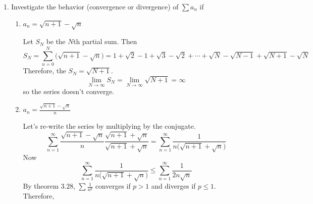 \begin{enumerate}
  Let \(\epsilon > 0\) be given.
  Then there exist \(N_1,N_2\in\mathbb{Z}^+\) such that for \(n\geq N_1\) and
  \(n\geq N_2\)
  \begin{align*}
    \lvert a_n - a\rvert & < \frac{\epsilon}{2}\\
    \lvert b_n - b\rvert & < \frac{\epsilon}{2}
  \end{align*}
  Let \(N = \max\{N_1,N_2\}\).
  Then when \(n\geq N\),
  \begin{align*}
    \lvert c_n - c\rvert & = \lvert a_n + b_n - (a + b)\rvert
                           \eqnumtag\label{3.5.a}\\
                         & \leq \lvert a_n - a\rvert + \lvert b_n - b\rvert
                           \eqnumtag\label{3.5.b}\\
                         & < \frac{\epsilon}{2} + \frac{\epsilon}{2}\\
                         & = \epsilon
  \end{align*}
  From \cref{3.5.a,3.5.b}, we have that
  \[
  \lim\sup c_n\leq\lim\sup a_n + \lim\sup b_n,
  \]
  and since \(c_n = a_n + b_n\), the identity follows.
\item
  Investigate the behavior (convergence or divergence) of \(\sum a_n\) if
  \begin{enumerate}[label = (\alph*)]
  \item
    \(a_n = \sqrt{n + 1} - \sqrt{n}\)
    \par\smallskip
    Let \(S_N\) be the \(N\)th partial sum.
    Then
    \[
    S_N = \sum_{n = 0}^N\bigl(\sqrt{n + 1} - \sqrt{n}\bigr) =
    1 + \sqrt{2} - 1 + \sqrt{3} - \sqrt{2} + \cdots + \sqrt{N} - \sqrt{N - 1}
    + \sqrt{N + 1} - \sqrt{N}
    \]
    Therefore, the \(S_N = \sqrt{N + 1}\).
    \[
    \lim_{N\to\infty}S_N = \lim_{N\to\infty}\sqrt{N + 1} = \infty
    \]
    so the series doesn't converge.
  \item
    \(a_n = \frac{\sqrt{n + 1} - \sqrt{n}}{n}\)
    \par\smallskip
    Let's re-write the series by multiplying by the conjugate.
    \[
    \sum_{n = 1}^{\infty}\frac{\sqrt{n + 1} - \sqrt{n}}{n}
    \frac{\sqrt{n + 1} + \sqrt{n}}{\sqrt{n + 1} + \sqrt{n}} =
    \sum_{n = 1}^{\infty}\frac{1}{n\bigl(\sqrt{n + 1} + \sqrt{n}\bigr)}
    \]
    Now
    \[
    \sum_{n = 1}^{\infty}\frac{1}{n\bigl(\sqrt{n + 1} + \sqrt{n}\bigr)}\leq
    \sum_{n = 1}^{\infty}\frac{1}{2n\sqrt{n}}
    \]
    By theorem \(3.28\), \(\sum\frac{1}{n^p}\) converges if \(p > 1\) and
    diverges if \(p\leq 1\).
    Therefore,
    \[
\]
\end{enumerate}
\end{enumerate}

